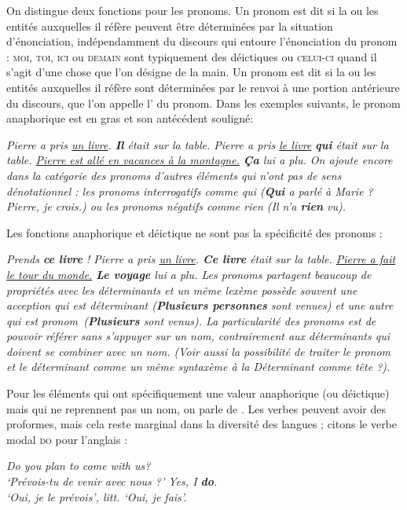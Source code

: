 {    On distingue deux fonctions pour les pronoms. Un pronom est dit  si la ou les entités auxquelles il réfère peuvent être déterminées par la situation d’énonciation, indépendamment du discours qui entoure l’énonciation du pronom : \textsc{moi,} \textsc{toi,} \textsc{ici} ou \textsc{demain} sont typiquement des déictiques ou \textsc{celui-ci} quand il s’agit d’une chose que l’on désigne de la main. Un pronom est dit  si la ou les entités auxquelles il réfère sont déterminées par le renvoi à une portion antérieure du discours, que l’on appelle l’ du pronom. Dans les exemples suivants, le pronom anaphorique est en gras et son antécédent souligné:
    
\ea
  \ea \itshape Pierre a pris \uline{un livre}. \textbf{Il}  était sur la table.
  \ex \itshape Pierre a pris \uline{le livre} \textbf{qui}  était sur la table.
  \ex \itshape \uline{Pierre est allé en vacances à la montagne.} \textbf{Ça} lui a plu.
  \z
\z
    On ajoute encore dans la catégorie des pronoms d’autres éléments qui n’ont pas de sens dénotationnel : les pronoms interrogatifs comme \textit{qui} (\textbf{\textit{Qui}} \textit{a parlé à Marie} ? \textit{Pierre, je crois.)} ou les pronoms négatifs comme \textit{rien} (\textit{Il n’a} \textbf{\textit{rien}} \textit{vu}).\textbf{ }

    Les fonctions anaphorique et déictique ne sont pas la spécificité des pronoms :
    
\ea
  \ea \itshape Prends \textbf{ce livre} !
  \ex \itshape Pierre a pris \uline{un livre}. \textbf{Ce livre}  était sur la table.
  \ex \itshape \uline{Pierre a fait le tour du monde.} \textbf{Le voyage}  lui a plu.
  \z
\z
    Les pronoms partagent beaucoup de propriétés avec les déterminants et un même lexème possède souvent une acception qui est déterminant (\textbf{\textit{Plusieurs personnes}} \textit{sont venues}) et une autre qui est pronom~(\textbf{\textit{Plusieurs}} \textit{sont venus}). La particularité des pronoms est de pouvoir référer sans s’appuyer sur un nom, contrairement aux déterminants qui doivent se combiner avec un nom. (Voir aussi la possibilité de traiter le pronom et le déterminant comme un même syntaxème à la  \textit{Déterminant comme tête} ?).

    Pour les éléments qui ont spécifiquement une valeur anaphorique (ou déictique) mais qui ne reprennent pas un nom, on parle de . Les verbes peuvent avoir des proformes, mais cela reste marginal dans la diversité des langues ; citons le verbe modal \textsc{do} pour l’anglais :
    
\ea 
  \ea \itshape Do you plan to come with us?\\
  \glt   ‘Prévois-tu de venir avec nous ?’
  \ex \itshape Yes, I \textbf{do}.\\
  \glt   ‘Oui, je le prévois’, litt. ‘Oui, je fais’.
  \z
\z
}
